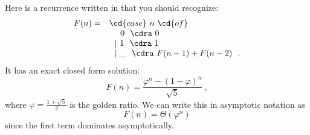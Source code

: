 \begin{cluster}
\label{grp:xmpl:analysis::recurrences::fibonacci}

\begin{example}[Fibonacci]
\label{xmpl:analysis::recurrences::fibonacci}
Here is a recurrence written in \PML{} that you should recognize:
\[
\begin{array}{ll}
F(n) =&\cd{case}~n~\cd{of}
\\ 
& ~~~~0~~\cdra~0
\\
& ~~|~1~~\cdra~1
\\
& ~~|~\_~~\cdra~F(n-1) + F(n-2)~~.
\end{array}
\]
It has an exact closed form solution:
 \[F(n) = \frac{\varphi^n - (1 - \varphi)^n}{\sqrt{5}}~,\]
where $\varphi = \frac{1 + \sqrt{5}}{2}$ is the golden ratio.
We can write this in asymptotic notation as \[F(n) =
\Theta(\varphi^n) \]
since the first term dominates asymptotically.

\end{example}
\end{cluster}

